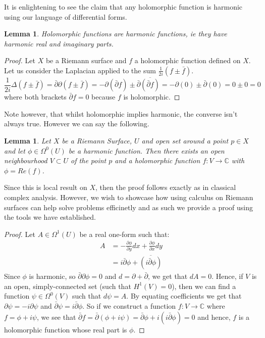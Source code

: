 \documentclass[a4paper,12pt]{report}
\theoremstyle{plain}
\newtheorem{lemma}[thm]{Lemma}
\theoremstyle{definition}
\begin{document}
It is enlightening to see the claim that any holomorphic function is harmonic using our language of differential forms.
\begin{lemma}\label{HolIsHarm}
  Holomorphic functions are harmonic functions, ie they have harmonic real and imaginary parts. 
\end{lemma} 
\begin{proof}
  Let $X$ be a Riemann surface and $f$ a holomorphic function defined on $X$.
  Let us consider the Laplacian applied to the sum $\frac{1}{2i}(f \pm \bar{f})$.
  \[\frac{1}{2i}\Delta(f \pm \bar{f}) = \bar{\partial}\partial(f \pm \bar{f})=-\partial(\bar{\partial}f) \pm \bar{\partial}\overline{(\bar{\partial}f)}=-\partial(0) \pm \bar{\partial}(0) = 0 \pm 0 = 0\]
  where both brackets $\bar{\partial} f = 0$ because $f$ is holomorphic.
\end{proof}

Note however, that whilst holomorphic implies harmonic, the converse isn't always true. However we can say the following.

\begin{lemma}\label{HarmRealHol}
  Let $X$ be a Riemann Surface, $U$ and open set around a point $p \in X$ and let $\phi \in \Omega^0(U)$ be a harmonic function. Then there exists an open neighbourhood $V \subset U$ of the point $p$ and a holomorphic function $f \colon V \rightarrow \mathbb{C}$ with $\phi = Re(f)$.
\end{lemma}
Since this is local result on $X$, then the proof follows exactly as in classical complex analysis. However, we wish to showcase how using calculus on Riemann surfaces can help solve problems efficinetly and as such we provide a proof using the tools we have established.
\begin{proof}
  Let $A \in \Omega^1(U)$ be a real one-form such that: 
  \begin{align*}
    A &= -\frac{\partial \phi}{\partial y} dx + \frac{\partial \phi}{\partial x} dy \\ &= i\bar{\partial}\phi + \overline{(i\bar{\partial}\phi)}
  \end{align*}
  Since $\phi$ is harmonic, so $\bar{\partial}\partial \phi = 0$ and $d = \partial + \bar{\partial}$, we get that $dA = 0$. Hence, if $V$ is an open, simply-connected set (such that $H^1(V)=0$), then we can find a function $\psi \in \Omega^0(V)$ such that $d\psi = A$. By equating coefficients we get that $\partial \psi = -i \partial \psi$ and $\bar{\partial} \psi = i \bar{\partial} \phi$. So if we construct a function $f \colon V \rightarrow \mathbb{C}$ where $f = \phi + i \psi$, we see that $\bar{\partial}f = \bar{\partial}(\phi + i\psi) = \bar{\partial}\phi +i(i\bar{\partial}\phi) = 0$ and hence, $f$ is a holomorphic function whose real part is $\phi$. 
\end{proof}
\end{document}
